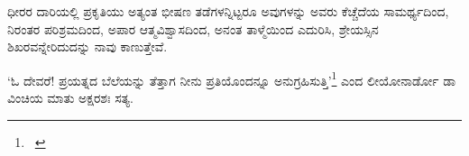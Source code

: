 ಧೀರರ ದಾರಿಯಲ್ಲಿ ಪ್ರಕೃತಿಯು ಅತ್ಯಂತ ಭೀಷಣ ತಡೆಗಳನ್ನಿಟ್ಟರೂ ಅವುಗಳನ್ನು ಅವರು ಕೆಚ್ಚೆದೆಯ ಸಾಮರ್ಥ್ಯದಿಂದ, ನಿರಂತರ ಪರಿಶ್ರಮದಿಂದ, ಅಪಾರ ಆತ್ಮವಿಶ್ವಾಸದಿಂದ, ಅನಂತ ತಾಳ್ಮೆಯಿಂದ ಎದುರಿಸಿ, ಶ್ರೇಯಸ್ಸಿನ ಶಿಖರವನ್ನೇರಿದುದನ್ನು ನಾವು ಕಾಣುತ್ತೇವೆ.

‘ಓ ದೇವರೆ! ಪ್ರಯತ್ನದ ಬೆಲೆಯನ್ನು ತೆತ್ತಾಗ ನೀನು ಪ್ರತಿಯೊಂದನ್ನೂ ಅನುಗ್ರಹಿಸುತ್ತಿ’\footnote{

~\hfill{}} ಎಂದ ಲೀಯೋನಾರ್ಡೋ ಡಾ ವಿಂಚಿಯ ಮಾತು ಅಕ್ಷರಶಃ ಸತ್ಯ.

\chapterend


